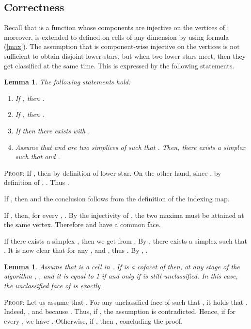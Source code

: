 \documentclass[12pt]{article}
\newtheorem{lem}[thm]{Lemma}
\newenvironment{proof}{\noindent\textsc{Proof: }}{\hfill\par\medskip\par}
\begin{document}
\subsection{Correctness}

Recall that  is a function  whose  components  are injective on the vertices of ; moreover,  is  extended to  defined on cells  of any dimension by using formula (\ref{max}).  The assumption that   is component-wise injective on the vertices is not sufficient to obtain disjoint lower stars, but when two lower
stars meet, then they get classified at the same time. This is expressed by the following statements.

\begin{lem}
\label{lem:inj}
The following statements hold:
\begin{enumerate}
\item[(1)] If , then .
\item[(2)] If , then .
\item[(3)] If  then there exists  with .
\item[(4)] Assume that  and  are two  simplices  of  such that .
Then, there exists a simplex  such that  and .
\end{enumerate}
\end{lem}

\begin{proof}
 If , then  by definition of lower star. On the other hand,  since
, by definition of , . Thus .

\noindent
 If , then  and the conclusion follows from the definition of the indexing map.

\noindent
 If , then, for every , . By
the injectivity of , the two maxima must be attained at the same vertex. Therefore  and  have a common face.

\noindent
  If  there exists a simplex
, then  we get  from . By  ,
there exists a simplex  such that . It is now clear that for any
,  and  , thus
. By , .
\end{proof}

\begin{lem}\label{lem:correctness1}
Assume that  is a cell in . If  is a cofacet of  then, at any stage of the algorithm , , and it is equal to 1 if and only if  is still unclassified. In this case, the unclassified face of  is exactly .
\end{lem}

\begin{proof}
Let us assume that . For any unclassified face   of  such that , it holds that
. Indeed, , and  because . Thus, if , the assumption  is contradicted. Hence, if  for every , we have .  Otherwise, if , then , concluding the proof.
\end{proof}
\end{document}
